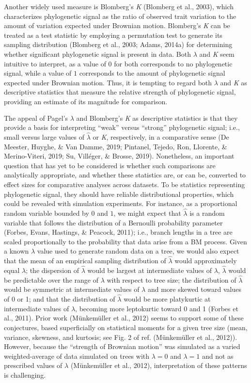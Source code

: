 \documentclass[
]{article}
\begin{document}
Another widely used measure is Blomberg's \emph{K} (Blomberg et al.,
2003), which characterizes phylogenetic signal as the ratio of observed
trait variation to the amount of variation expected under Brownian
motion. Blomberg's \emph{K} can be treated as a test statistic by
employing a permutation test to generate its sampling distribution
(Blomberg et al., 2003; Adams, 2014a) for determining whether
significant phylogenetic signal is present in data. Both \(\lambda\) and
\emph{K} seem intuitive to interpret, as a value of \(0\) for both
corresponds to no phylogenetic signal, while a value of \(1\)
corresponds to the amount of phylogenetic signal expected under Brownian
motion. Thus, it is tempting to regard both \(\lambda\) and \emph{K} as
descriptive statistics that measure the relative strength of
phylogenetic signal, providing an estimate of its magnitude for
comparison. \hfill\break

The appeal of Pagel's \(\lambda\) and Blomberg's \emph{K} as descriptive
statistics is that they provide a basis for interpreting ``weak'' versus
``strong'' phylogenetic signal; i.e., small versus large values of
\(\hat{\lambda}\) or \emph{K}, respectively, in a comparative sense (De
Meester, Huyghe, \& Van Damme, 2019; Pintanel, Tejedo, Ron, Llorente, \&
Merino-Viteri, 2019; Su, Villéger, \& Brosse, 2019). Nonetheless, an
important question that has yet to be considered is whether such
comparisons are analytically appropriate, and whether these statistics
are, or can be, converted to effect sizes for comparative analyses
across datasets. To be statistics representing phylogenetic signal, they
should have reliable distributional properties, which could be revealed
with simulation experiments. For instance, as a proportional random
variable bounded by \(0\) and \(1\), we might expect that
\(\hat{\lambda}\) is a random variable that follows the distribution of
a Bernoulli probability parameter (Forbes, Evans, Hastings, \& Peacock,
2011); i.e., branch lengths in a tree are scaled proportionally to the
probability that data arise from a BM process. Given a known \(\lambda\)
value used to generate random data on a tree, we would also expect that
the mean of an empirical sampling distribution of \(\hat{\lambda}\)
would approximately equal \(\lambda\); the dispersion of
\(\hat{\lambda}\) would be largest at intermediate values of
\(\lambda\), \(\hat{\lambda}\) would be predictable over the range of
\(\lambda\) with respect to tree size; the distribution of
\(\hat{\lambda}\) would be symmetric at intermediate values of
\(\lambda\) and more skewed toward values of 0 or 1; and that the
distribution of \(\hat{\lambda}\) would be more platykurtic at
intermediate values of \(\lambda\), becoming more leptokurtic toward 0
and 1 (Forbes et al., 2011). Prior work (Münkemüller et al., 2012) seems
to support some of these conjectures, based superficially on statistical
moments for a given tree size (mean, variance, skewness, and kurtosis;
see Fig. 2 of ref. (Münkemüller et al., 2012)). However, because the
``strength of Brownian motion'' was simulated as a varied
weighted-average of data simulated on trees with \(\lambda=0\) and
\(\lambda=1\) and not as prescribed values of \(\lambda\) (Münkemüller
et al., 2012), interpretation of these patterns is challenging.
\hfill\break
\end{document}
